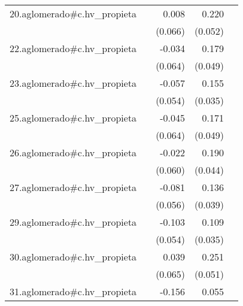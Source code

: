 {\begin{longtable}{l*{4}{D{.}{.}{-1}}}
\addlinespace
20.aglomerado#c.hv\_propieta&                     &       0.008         &       0.220\sym{***}&                     \\
            &                     &     (0.066)         &     (0.052)         &                     \\
\addlinespace
22.aglomerado#c.hv\_propieta&                     &      -0.034         &       0.179\sym{***}&                     \\
            &                     &     (0.064)         &     (0.049)         &                     \\
\addlinespace
23.aglomerado#c.hv\_propieta&                     &      -0.057         &       0.155\sym{***}&                     \\
            &                     &     (0.054)         &     (0.035)         &                     \\
\addlinespace
25.aglomerado#c.hv\_propieta&                     &      -0.045         &       0.171\sym{***}&                     \\
            &                     &     (0.064)         &     (0.049)         &                     \\
\addlinespace
26.aglomerado#c.hv\_propieta&                     &      -0.022         &       0.190\sym{***}&                     \\
            &                     &     (0.060)         &     (0.044)         &                     \\
\addlinespace
27.aglomerado#c.hv\_propieta&                     &      -0.081         &       0.136\sym{***}&                     \\
            &                     &     (0.056)         &     (0.039)         &                     \\
\addlinespace
29.aglomerado#c.hv\_propieta&                     &      -0.103         &       0.109\sym{**} &                     \\
            &                     &     (0.054)         &     (0.035)         &                     \\
\addlinespace
30.aglomerado#c.hv\_propieta&                     &       0.039         &       0.251\sym{***}&                     \\
            &                     &     (0.065)         &     (0.051)         &                     \\
\addlinespace
31.aglomerado#c.hv\_propieta&                     &      -0.156\sym{*}  &       0.055         &                     \\

\end{longtable}}
